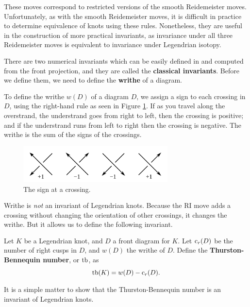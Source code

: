 These moves correspond to restricted versions of the smooth Reidemeister moves.
Unfortunately, as with the smooth Reidemeister moves, it is difficult in practice to determine equivalence of knots using these rules. Nonetheless, they are useful in the construction of more practical invariants, as invariance under all three Reidemeister moves is equivalent to invariance under Legendrian isotopy.


There are two numerical invariants which can be easily defined in and computed from the front projection, and they are called the \textbf{classical invariants}. Before we define them, we need to define the \textbf{writhe} of a diagram.

To define the writhe $w(D)$ of a diagram $D$, we assign a sign to each crossing in $D$, using the right-hand rule as seen in Figure \ref{fig:writhe}. If as you travel along the overstrand, the understrand goes from right to left, then the crossing is positive; and if the understrand runs from left to right then the crossing is negative. 
The writhe is the sum of the signs of the crossings.

\begin{figure}[ht]
    \centering
    \includegraphics[width=0.7\textwidth]{images/writhe.pdf}
    \caption{The sign at a crossing.}%
    \label{fig:writhe}
\end{figure}

Writhe is \emph{not} an invariant of Legendrian knots. Because the RI move adds a crossing without changing the orientation of other crossings, it changes the writhe. But it allows us to define the following invariant.

\begin{definition}
    Let $K$ be a Legendrian knot, and $D$ a front diagram for $K$. Let $\operatorname{c}_r(D)$ be the number of right cusps in $D$, and $w(D)$ the writhe of $D$.
    Define the \textbf{Thurston-Bennequin number}, or $\operatorname{tb}$, as
    \[
        \operatorname{tb}(K) = w(D) - \operatorname{c}_r(D).
    \]
\end{definition}

It is a simple matter to show that the Thurston-Bennequin number is an invariant of Legendrian knots.

